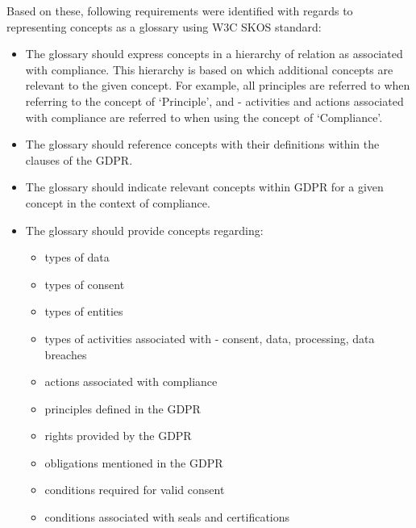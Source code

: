 Based on these, following requirements were identified with regards to representing concepts as a glossary using W3C SKOS standard:
\begin{itemize}
    \item The glossary should express concepts in a hierarchy of relation as associated with compliance. This hierarchy is based on which additional concepts are relevant to the given concept. For example, all principles are referred to when referring to the concept of `Principle', and - activities and actions associated with compliance are referred to when using the concept of `Compliance'.
    \item The glossary should reference concepts with their definitions within the clauses of the GDPR.
    \item The glossary should indicate relevant concepts within GDPR for a given concept in the context of compliance.
    \item The glossary should provide concepts regarding:
    \begin{itemize}
        \item types of data
        \item types of consent
        \item types of entities
        \item types of activities associated with - consent, data, processing, data breaches
        \item actions associated with compliance
        \item principles defined in the GDPR
        \item rights provided by the GDPR
        \item obligations mentioned in the GDPR
        \item conditions required for valid consent
        \item conditions associated with seals and certifications
    \end{itemize}
\end{itemize}

